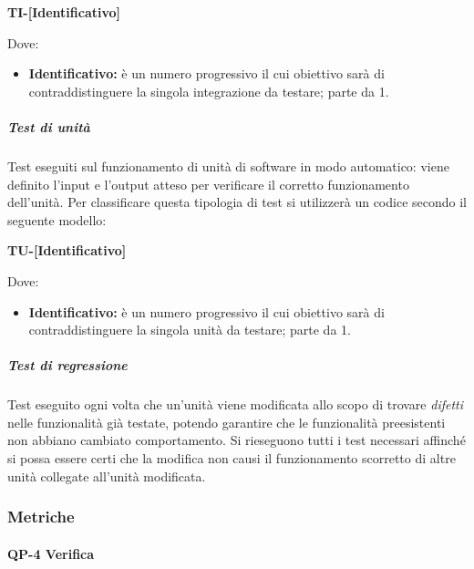                         \begin{center}
                        	\textbf{TI-[Identificativo]}
                        \end{center}
                        Dove:
                        
						\begin{itemize}
                       		\item \textbf{Identificativo:} è un numero progressivo il cui obiettivo sarà di contraddistinguere la singola integrazione da testare; parte da 1.
						\end{itemize}
					
                    \subparagraph*{Test di unità}
                            Test eseguiti sul funzionamento di unità di software in modo automatico: viene definito l'input e l'output atteso per verificare il corretto funzionamento dell'unità.
                            Per classificare questa tipologia di test si utilizzerà un codice secondo il seguente modello:     

                            \begin{center}
                            	\textbf{TU-[Identificativo]}
                            \end{center}
                            Dove:
                            
							\begin{itemize}
                            	\item \textbf{Identificativo:} è un numero progressivo il cui obiettivo sarà di contraddistinguere la singola unità da testare; parte da 1.
							\end{itemize}
						
                    \subparagraph*{Test di regressione}
        				Test eseguito ogni volta che un'unità viene modificata allo scopo di trovare \textit{difetti} nelle funzionalità già testate, potendo garantire che le funzionalità preesistenti non abbiano cambiato comportamento. Si rieseguono tutti i test necessari affinché si possa essere certi che la modifica non causi il funzionamento scorretto di altre unità collegate all'unità modificata.


    \subsubsection{Metriche}

    \paragraph{QP-4 Verifica}

